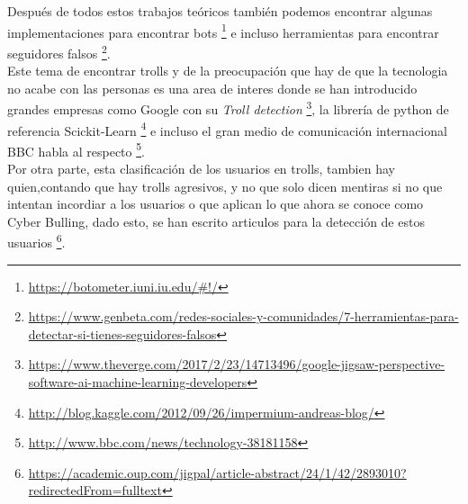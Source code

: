\documentclass[../all.tex]{subfiles}
\begin{document}
    Después de todos estos trabajos teóricos también podemos encontrar algunas implementaciones para encontrar bots \footnote{\tiny\url{https://botometer.iuni.iu.edu/\#!/}} e incluso herramientas para encontrar seguidores falsos \footnote{\tiny\url{https://www.genbeta.com/redes-sociales-y-comunidades/7-herramientas-para-detectar-si-tienes-seguidores-falsos}}.\\
    
    Este tema de encontrar trolls y de la preocupación que hay de que la tecnologia no acabe con las personas es una area de interes donde se han introducido grandes empresas como Google con su 
    \textit{Troll detection} \footnote{\tiny\url{https://www.theverge.com/2017/2/23/14713496/google-jigsaw-perspective-software-ai-machine-learning-developers}}, la librería de python de referencia Scickit-Learn \footnote{\tiny\url{http://blog.kaggle.com/2012/09/26/impermium-andreas-blog/}}
    e incluso el gran medio de comunicación internacional BBC habla al respecto
    \footnote{\tiny \url{http://www.bbc.com/news/technology-38181158}}.\\
    
    Por otra parte, esta clasificación de los usuarios en trolls, tambien hay quien,contando que hay trolls agresivos, y no que solo dicen mentiras si no que intentan incordiar a los usuarios o que aplican lo que ahora se conoce como Cyber Bulling, dado esto, se han escrito articulos para la detección de estos usuarios \footnote{\tiny\url{https://academic.oup.com/jigpal/article-abstract/24/1/42/2893010?redirectedFrom=fulltext}}.\\
    

   
\end{document}
